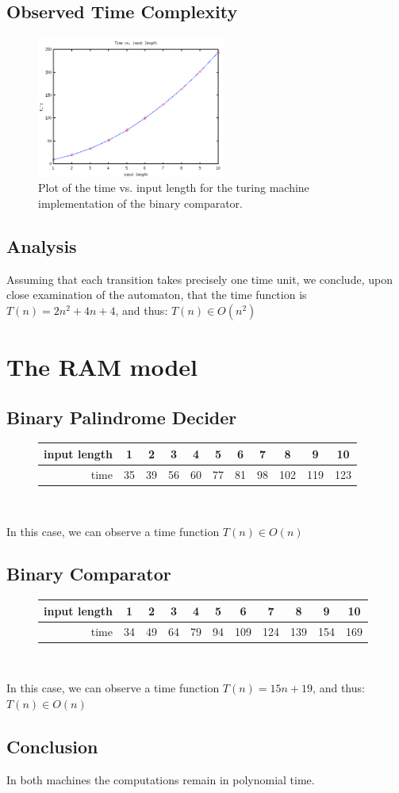 \documentclass[a4paper]{article}
\begin{document}
        \subsection{Observed Time Complexity}
            \begin{figure}[!h]
  			\centering
  			\includegraphics[width=0.55\textwidth,clip]{timecomparatorturing.png}
  			\caption{Plot of the time vs. input length for the turing machine implementation of the binary comparator.}
  			\end{figure}
  		\subsection{Analysis}
  		    Assuming that each transition takes precisely one time unit, we conclude, upon close examination of the automaton, that the time function is $ T(n)=2 n^2+4 n+4 $, and thus: $T(n)\in O(n^2)$
    \section{The RAM model}
        \subsection{Binary Palindrome Decider}
            \begin{figure}[!h]
  			\centering
  			\begin{tabular}{r|c|c|c|c|c|c|c|c|c|c|} \hline
  				input length  & 1 & 2 & 3 & 4 & 5 & 6 & 7 & 8 & 9 & 10 \\ \hline
  				time          & 35 & 39 & 56 & 60 & 77 & 81 & 98 & 102 & 119 & 123 \\ \hline
  		    \end{tabular} \\
  		    \end{figure}
  		    In this case, we can observe a time function $ T(n)\in O(n)$
        \subsection{Binary Comparator}
            \begin{figure}[!h]
  			\centering
  			\begin{tabular}{r|c|c|c|c|c|c|c|c|c|c|} \hline
  				input length  & 1 & 2 & 3 & 4 & 5 & 6 & 7 & 8 & 9 & 10 \\ \hline
  				time          & 34 & 49 & 64 & 79 & 94 & 109 & 124 & 139 & 154 & 169 \\ \hline
  		    \end{tabular} \\
  		    \end{figure}
  		    In this case, we can observe a time function $ T(n)=15n+19 $, and thus: $T(n)\in O(n)$
  		\subsection{Conclusion}
  		    In both machines the computations remain in polynomial time.
		
\end{document}
